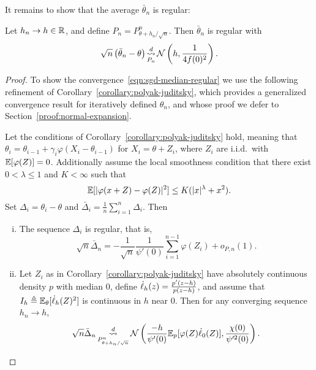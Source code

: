 It remains to show that the average $\bar{\theta}_n$ is regular:
\begin{lemma}
  \label{lemma:sgd-median-regular}
  Let $h_n \to h \in \mathbb{R}$, and define $P_n = P_{\theta + h_n / \sqrt{n}}^n$.
  Then $\bar{\theta}_n$ is regular with
  \begin{align}
    \label{eqn:sgd-median-regular}
    \sqrt{n}\left( \bar{\theta}_n - \theta\right)
    \mathop{\stackrel{d}{\rightsquigarrow}}_{P_n}
    \mathcal{N}\left( h,\frac{1}{4 f(0)^2}\right).
  \end{align}
\end{lemma}
\begin{proof}
  To show the convergence~\eqref{eqn:sgd-median-regular} we use the
  following refinement of Corollary~\ref{corollary:polyak-juditsky}, which
  provides a generalized convergence result for iteratively defined
  $\theta_n$, and whose
  proof we defer to Section~\ref{proof:normal-expansion}.
  \begin{corollary}
    \label{corollary:normal-expansion}
    Let the conditions of Corollary~\ref{corollary:polyak-juditsky} hold,
    meaning that $\theta_i = \theta_{i-1} + \gamma_i \varphi(X_i -
    \theta_{i-1})$ for $X_i = \theta + Z_i$, where $Z_i$ are i.i.d.\ with
    $\mathbb{E}[\varphi(Z)] = 0$. Additionally assume the local smoothness
    condition that there exist $0 < \lambda \le 1$ and $K < \infty$ such
    that
    \begin{equation}
      \label{eqn:additional-local-smooth}
      \mathbb{E}[|\varphi(x + Z) - \varphi(Z)|^2]
      \le K (|x|^\lambda + x^2).
    \end{equation}
    Set $\Delta_i = \theta_i - \theta$ and $\bar{\Delta}_i = \frac{1}{n}
    \sum_{i=1}^n \Delta_i$. Then
    \begin{enumerate}[(i)]
    \item \label{item:regularity}
      The sequence $\Delta_i$ is regular, that is,
      \begin{equation}
        \sqrt{n} \bar{\Delta}_n
        = -\frac{1}{\sqrt{n}} \frac{1}{\psi'(0)} \sum_{i=1}^{n-1} \varphi(Z_i)
        + o_{P,n}(1).
        \label{eq:normal_expansion_lem}
      \end{equation}
    \item \label{item:apply-le-cam} Let $Z_i$ as in
      Corollary~\ref{corollary:polyak-juditsky} have absolutely continuous
      density $p$ with median $0$, define $\dot{\ell}_h(z) = \frac{p'(z - h)}{p(z
        - h)}$, and assume that $I_h \triangleq \mathbb{E}_\theta[\dot{\ell}_h(Z)^2]$ is
      continuous in $h$ near 0.  Then for any converging sequence $h_n \to h$,
      \begin{equation*}
        \sqrt{n} \bar{\Delta}_n
        \mathop{\stackrel{d}{\rightsquigarrow}}_{P_{\theta + h_n/\sqrt{n}}^n}
        \mathcal{N}\left( \frac{-h}{\psi'(0)} \mathbb{E}_p[\varphi(Z) \dot{\ell}_0(Z)],
        \frac{\chi(0)}{\psi'^2(0)} \right).
      \end{equation*}
    \end{enumerate}
  \end{corollary}


\end{proof}
